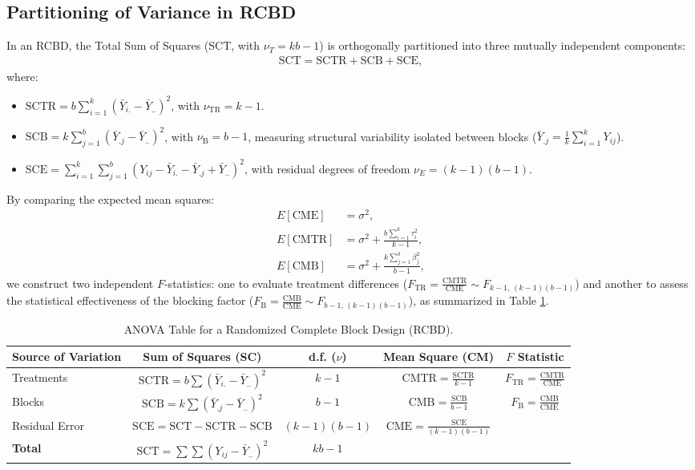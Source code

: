 \subsection{Partitioning of Variance in RCBD}
In an RCBD, the Total Sum of Squares ($\text{SCT}$, with $\nu_T = kb - 1$) is orthogonally partitioned into three mutually independent components:
\begin{align}
	\text{SCT} = \text{SCTR} + \text{SCB} + \text{SCE},
\end{align}
where:
\begin{itemize}
	\item $\text{SCTR} = b \sum_{i=1}^k (\bar{Y}_{i.} - \bar{Y}_{..})^2$, with $\nu_{\text{TR}} = k - 1$.
	\item $\text{SCB} = k \sum_{j=1}^b (\bar{Y}_{.j} - \bar{Y}_{..})^2$, with $\nu_{\text{B}} = b - 1$, measuring structural variability isolated between blocks ($\bar{Y}_{.j} = \frac{1}{k} \sum_{i=1}^k Y_{ij}$).
	\item $\text{SCE} = \sum_{i=1}^k \sum_{j=1}^b (Y_{ij} - \bar{Y}_{i.} - \bar{Y}_{.j} + \bar{Y}_{..})^2$, with residual degrees of freedom $\nu_E = (k - 1)(b - 1)$.
\end{itemize}

By comparing the expected mean squares:
\begin{align}
	E[\text{CME}] &= \sigma^2, \\
	E[\text{CMTR}] &= \sigma^2 + \frac{b \sum_{i=1}^k \tau_i^2}{k - 1}, \\
	E[\text{CMB}] &= \sigma^2 + \frac{k \sum_{j=1}^b \beta_j^2}{b - 1},
\end{align}
we construct two independent $F$-statistics: one to evaluate treatment differences ($F_{\text{TR}} = \frac{\text{CMTR}}{\text{CME}} \sim F_{k-1, \, (k-1)(b-1)}$) and another to assess the statistical effectiveness of the blocking factor ($F_{\text{B}} = \frac{\text{CMB}}{\text{CME}} \sim F_{b-1, \, (k-1)(b-1)}$), as summarized in Table \ref{tab:anova_dbca}.

\begin{table}[htbp]
	\centering
	\caption{ANOVA Table for a Randomized Complete Block Design (RCBD).}
	\label{tab:anova_dbca}
	\begin{tabular}{lcccc}
		\hline
		\textbf{Source of Variation} & \textbf{Sum of Squares (SC)} & \textbf{d.f. ($\nu$)} & \textbf{Mean Square (CM)} & \textbf{$F$ Statistic} \\ \hline
		Treatments & $\text{SCTR} = b \sum (\bar{Y}_{i.} - \bar{Y}_{..})^2$ & $k - 1$ & $\text{CMTR} = \frac{\text{SCTR}}{k-1}$ & $F_{\text{TR}} = \frac{\text{CMTR}}{\text{CME}}$ \\
		Blocks & $\text{SCB} = k \sum (\bar{Y}_{.j} - \bar{Y}_{..})^2$ & $b - 1$ & $\text{CMB} = \frac{\text{SCB}}{b-1}$ & $F_{\text{B}} = \frac{\text{CMB}}{\text{CME}}$ \\
		Residual Error & $\text{SCE} = \text{SCT} - \text{SCTR} - \text{SCB}$ & $(k-1)(b-1)$ & $\text{CME} = \frac{\text{SCE}}{(k-1)(b-1)}$ & \\ \hline
		\textbf{Total} & $\text{SCT} = \sum \sum (Y_{ij} - \bar{Y}_{..})^2$ & $kb - 1$ & & \\ \hline
	\end{tabular}
\end{table}

